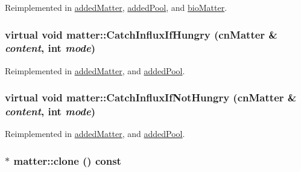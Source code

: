 Reimplemented in \hyperlink{classadded_matter_a453f802edd746aeb213c26c823678517}{addedMatter}, \hyperlink{classadded_pool_a67faed29b7b9d747de144920d7299a71}{addedPool}, and \hyperlink{classbio_matter_a5b83f540f697e51fcb235d252493675d}{bioMatter}.\hypertarget{classmatter_abbc0846a0f37653351fbae149fbb91ce}{
\subsubsection[{CatchInfluxIfHungry}]{\setlength{\rightskip}{0pt plus 5cm}virtual void matter::CatchInfluxIfHungry ({\bf cnMatter} \& {\em content}, \/  int {\em mode})}}
\label{classmatter_abbc0846a0f37653351fbae149fbb91ce}


Reimplemented in \hyperlink{classadded_matter_a82ac9bf0ca59c436d6f393467b3bb70a}{addedMatter}, and \hyperlink{classadded_pool_afbd54d1de5f10317e091a58e46be0ce3}{addedPool}.\hypertarget{classmatter_af6764fccc5304bb9832879c40e7c7cba}{
\subsubsection[{CatchInfluxIfNotHungry}]{\setlength{\rightskip}{0pt plus 5cm}virtual void matter::CatchInfluxIfNotHungry ({\bf cnMatter} \& {\em content}, \/  int {\em mode})}}
\label{classmatter_af6764fccc5304bb9832879c40e7c7cba}


Reimplemented in \hyperlink{classadded_matter_a23ebccf4a6eeb768a053a6c8c8190111}{addedMatter}, and \hyperlink{classadded_pool_abe54b048d58a11fda014be4710031f56}{addedPool}.\hypertarget{classmatter_afca594a86c75c8f40856bc5c8711266c}{
\subsubsection[{clone}]{ $\ast$ matter::clone () const}}
\label{classmatter_afca594a86c75c8f40856bc5c8711266c}


